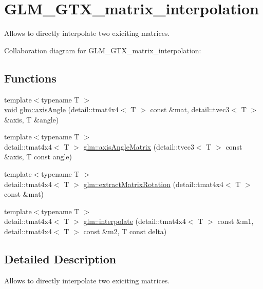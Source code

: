 \hypertarget{group__gtx__matrix__interpolation}{}\section{G\+L\+M\+\_\+\+G\+T\+X\+\_\+matrix\+\_\+interpolation}
\label{group__gtx__matrix__interpolation}


Allows to directly interpolate two exiciting matrices.  


Collaboration diagram for G\+L\+M\+\_\+\+G\+T\+X\+\_\+matrix\+\_\+interpolation\+:
\subsection*{Functions}
\begin{DoxyCompactItemize}
\item 
{\footnotesize template$<$typename T $>$ }\\\hyperlink{_s_d_l__audio_8h_a52835ae37c4bb905b903cbaf5d04b05f}{void} \hyperlink{group__gtx__matrix__interpolation_ga9d83dd69424140379624d570b0a6c238}{glm\+::axis\+Angle} (detail\+::tmat4x4$<$ T $>$ const \&mat, detail\+::tvec3$<$ T $>$ \&axis, T \&angle)
\item 
{\footnotesize template$<$typename T $>$ }\\detail\+::tmat4x4$<$ T $>$ \hyperlink{group__gtx__matrix__interpolation_ga9c35118f46d7e7baf93b63612628b600}{glm\+::axis\+Angle\+Matrix} (detail\+::tvec3$<$ T $>$ const \&axis, T const angle)
\item 
{\footnotesize template$<$typename T $>$ }\\detail\+::tmat4x4$<$ T $>$ \hyperlink{group__gtx__matrix__interpolation_ga67504746efa8e5f643498a2223a437ce}{glm\+::extract\+Matrix\+Rotation} (detail\+::tmat4x4$<$ T $>$ const \&mat)
\item 
{\footnotesize template$<$typename T $>$ }\\detail\+::tmat4x4$<$ T $>$ \hyperlink{group__gtx__matrix__interpolation_ga797ad3192e9cfb80840a93a20b55896a}{glm\+::interpolate} (detail\+::tmat4x4$<$ T $>$ const \&m1, detail\+::tmat4x4$<$ T $>$ const \&m2, T const delta)
\end{DoxyCompactItemize}


\subsection{Detailed Description}
Allows to directly interpolate two exiciting matrices. 

